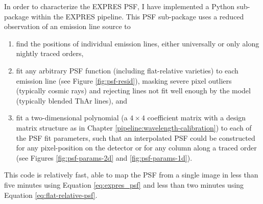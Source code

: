In order to characterize the EXPRES PSF, I have implemented a Python sub-package within the EXPRES pipeline. This PSF sub-package uses a reduced observation of an emission line source to
\begin{enumerate}
    \item find the positions of individual emission lines, either universally or only along night\-ly traced orders,
    \item fit any arbitrary PSF function (including flat-relative varieties) to each emission line (see Figure \ref{fig:psf-resid}), masking severe pixel outliers (typically cosmic rays) and rejecting lines not fit well enough by the model (typically blended ThAr lines), and
    \item fit a two-dimensional polynomial (a $4 \times 4$ coefficient matrix with a design matrix structure as in Chapter \ref{pipeline:wavelength-calibration}) to each of the PSF fit parameters, such that an interpolated PSF could be constructed for any pixel-position on the detector or for any column along a traced order (see Figures \ref{fig:psf-params-2d} and \ref{fig:psf-params-1d}).
\end{enumerate}
This code is relatively fast, able to map the PSF from a single image in less than five minutes using Equation \ref{eq:expres_psf} and less than two minutes using Equation \ref{eq:flat-relative-psf}.

